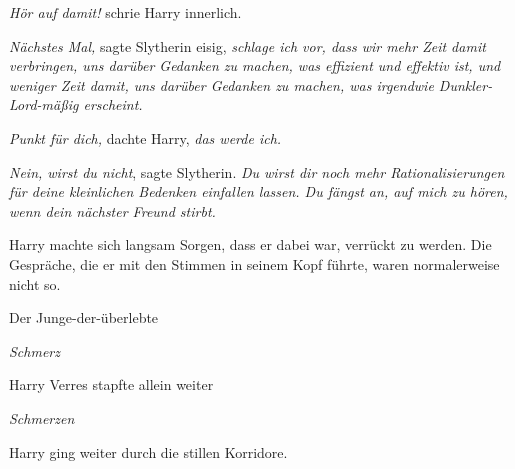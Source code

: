 \emph{Hör auf damit!} schrie Harry innerlich.

\emph{Nächstes Mal,} sagte Slytherin eisig, \emph{schlage ich vor, dass wir mehr Zeit damit verbringen, uns darüber Gedanken zu machen, was effizient und effektiv ist, und weniger Zeit damit, uns darüber Gedanken zu machen, was irgendwie Dunkler-Lord-mäßig erscheint.}

\emph{Punkt für dich,} dachte Harry, \emph{das werde ich.}

\emph{Nein, wirst du nicht}, sagte Slytherin. \emph{Du wirst dir noch mehr Rationalisierungen für deine kleinlichen Bedenken einfallen lassen. Du fängst an, auf mich zu hören, wenn dein \emph{nächster} Freund stirbt.}

Harry machte sich langsam Sorgen, dass er dabei war, verrückt zu werden. Die Gespräche, die er mit den Stimmen in seinem Kopf führte, waren normalerweise nicht so.

Der Junge-der-überlebte

\emph{Schmerz}

Harry Verres stapfte allein weiter

\emph{Schmerzen}

Harry ging weiter durch die stillen Korridore.

\later

